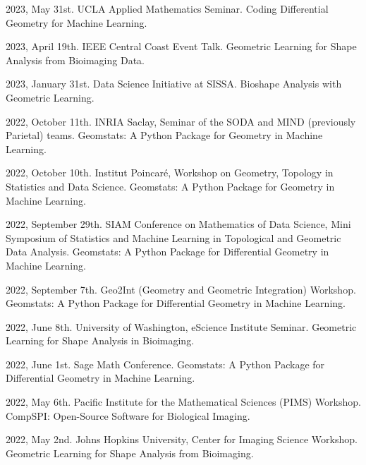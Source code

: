 2023, May 31st. UCLA Applied Mathematics Seminar. Coding Differential Geometry for Machine Learning.

2023, April 19th. IEEE Central Coast Event Talk. Geometric Learning for Shape Analysis from Bioimaging Data.

2023, January 31st. Data Science Initiative at SISSA. Bioshape Analysis with Geometric Learning.

2022, October 11th. INRIA Saclay, Seminar of the SODA and MIND (previously Parietal) teams. Geomstats: A Python Package for Geometry in Machine Learning.

2022, October 10th. Institut Poincaré, Workshop on Geometry, Topology in Statistics and Data Science. Geomstats: A Python Package for Geometry in Machine Learning.

2022, September 29th. SIAM Conference on Mathematics of Data Science, Mini Symposium of Statistics and Machine Learning in Topological and Geometric Data Analysis. Geomstats: A Python Package for Differential Geometry in Machine Learning.

2022, September 7th. Geo2Int (Geometry and Geometric Integration) Workshop. Geomstats: A Python Package for Differential Geometry in Machine Learning.

2022, June 8th. University of Washington, eScience Institute Seminar. Geometric Learning for Shape Analysis in Bioimaging.

2022, June 1st. Sage Math Conference. Geomstats: A Python Package for Differential Geometry in Machine Learning.

2022, May 6th. Pacific Institute for the Mathematical Sciences (PIMS) Workshop. CompSPI: Open-Source Software for Biological Imaging.

2022, May 2nd. Johns Hopkins University, Center for Imaging Science Workshop. Geometric Learning for Shape Analysis from Bioimaging. 